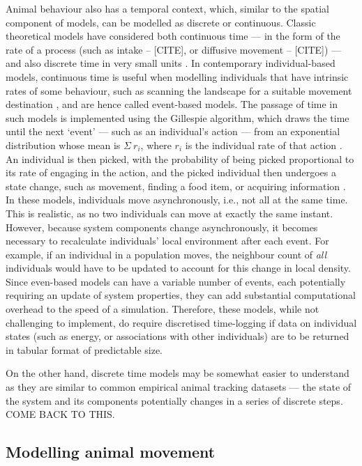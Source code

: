 Animal behaviour also has a temporal context, which, similar to the spatial component of models, can be modelled as discrete or continuous.
Classic theoretical models have considered both continuous time --- in the form of the rate of a process (such as intake -- [CITE], or diffusive movement -- [CITE]) --- and also discrete time in very small units \citep[e.g.][]{hamilton1971}.
In contemporary individual-based models, continuous time is useful when modelling individuals that have intrinsic rates of some behaviour, such as scanning the landscape for a suitable movement destination \citep{netz2022}, and are hence called event-based models.
The passage of time in such models is implemented using the Gillespie algorithm, which draws the time until the next `event' --- such as an individual's action --- from an exponential distribution whose mean is $\Sigma~r_i$, where $r_i$ is the individual rate of that action \citep{gillespie198x}.
An individual is then picked, with the probability of being picked proportional to its rate of engaging in the action, and the picked individual then undergoes a state change, such as movement, finding a food item, or acquiring information \citep{netz2022}.
In these models, individuals move asynchronously, i.e., not all at the same time.
This is realistic, as no two individuals can move at exactly the same instant.
However, because system components change asynchronously, it becomes necessary to recalculate individuals' local environment after each event.
For example, if an individual in a population moves, the neighbour count of \emph{all} individuals would have to be updated to account for this change in local density.
Since even-based models can have a variable number of events, each potentially requiring an update of system properties, they can add substantial computational overhead to the speed of a simulation.
Therefore, these models, while not challenging to implement, do require discretised time-logging if data on individual states (such as energy, or associations with other individuals) are to be returned in tabular format of predictable size.

On the other hand, discrete time models may be somewhat easier to understand as they are similar to common empirical animal tracking datasets --- the state of the system and its components potentially changes in a series of discrete steps. {\color{red} COME BACK TO THIS.}


\subsection*{Modelling animal movement}

